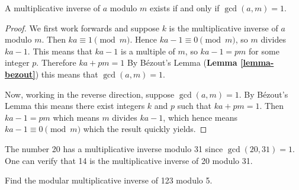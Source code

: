 \begin{proposition}\label{prop-multiplicative-inverse-exists-iff-coprime}
    A multiplicative inverse of $a$ modulo $m$ exists if and only if $\gcd(a,m) = 1$.
\end{proposition}
\begin{proof}
    We first work forwards and suppose $k$ is the multiplicative inverse of $a$ modulo $m$. Then $ka \equiv 1 \pmod m$. Hence $ka - 1 \equiv 0 \pmod m$, so $m$ divides $ka - 1$. This means that $ka - 1$ is a multiple of $m$, so $ka - 1 = pm$ for some integer $p$. Therefore $ka + pm = 1$ By B\'{e}zout's Lemma (\textbf{Lemma \ref{lemma-bezout}}) this means that $\gcd(a, m) = 1$.
    
    Now, working in the reverse direction, suppose $\gcd(a, m) = 1$. By B\'{e}zout's Lemma this means there exist integers $k$ and $p$ such that $ka + pm = 1$. Then $ka - 1 = pm$ which means $m$ divides $ka - 1$, which hence means $ka - 1 \equiv 0 \pmod m$ which the result quickly yields.
\end{proof}

\begin{example}
    The number 20 has a multiplicative inverse modulo 31 since $\gcd(20, 31) = 1$. One can verify that 14 is the multiplicative inverse of 20 modulo 31.
\end{example}

\begin{exercise}
    Find the modular multiplicative inverse of 123 modulo 5.
\end{exercise}


